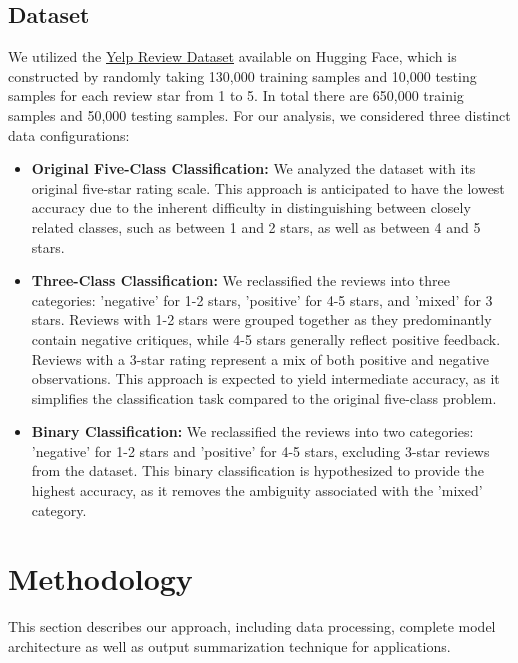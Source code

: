 \documentclass[12pt]{article}
\begin{document}
\subsection{Dataset}
We utilized the \href{https://huggingface.co/datasets/Yelp/yelp_review_full}{Yelp Review Dataset} available on Hugging Face, which is constructed by randomly taking 130,000 training samples and 10,000 testing samples for each review star from 1 to 5. In total there are 650,000 trainig samples and 50,000 testing samples. For our analysis, we considered three distinct data configurations:

\begin{itemize}
  \item \textbf{Original Five-Class Classification:} We analyzed the dataset with its original five-star rating scale. This approach is anticipated to have the lowest accuracy due to the inherent difficulty in distinguishing between closely related classes, such as between 1 and 2 stars, as well as between 4 and 5 stars.

  \item \textbf{Three-Class Classification:} We reclassified the reviews into three categories: 'negative' for 1-2 stars, 'positive' for 4-5 stars, and 'mixed' for 3 stars. Reviews with 1-2 stars were grouped together as they predominantly contain negative critiques, while 4-5 stars generally reflect positive feedback. Reviews with a 3-star rating represent a mix of both positive and negative observations. This approach is expected to yield intermediate accuracy, as it simplifies the classification task compared to the original five-class problem.

  \item \textbf{Binary Classification:} We reclassified the reviews into two categories: 'negative' for 1-2 stars and 'positive' for 4-5 stars, excluding 3-star reviews from the dataset. This binary classification is hypothesized to provide the highest accuracy, as it removes the ambiguity associated with the 'mixed' category.
\end{itemize}

\section{Methodology}
This section describes our approach, including data processing, complete model architecture as well as output summarization technique for applications.
\end{document}
